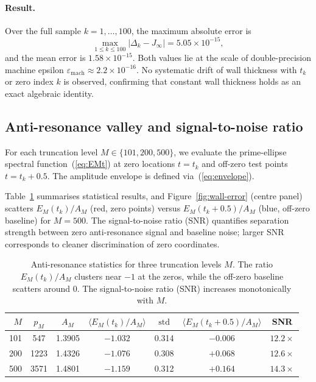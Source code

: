 \documentclass[10pt,reqno]{article}
\newcommand{\Jinf}{J_\infty}
\newcommand{\mach}{\varepsilon_{\text{mach}}}
\begin{document}
\paragraph{Result.} 
Over the full sample $k=1,\dots,100$, the maximum absolute error is
\[
\max_{1\le k\le 100} |\Delta_k - \Jinf| 
= 5.05\times10^{-15},
\]
and the mean error is $1.58\times10^{-15}$. Both values lie at the scale of double-precision machine epsilon $\mach\approx2.2\times10^{-16}$. No systematic drift of wall thickness with $t_k$ or zero index $k$ is observed, confirming that constant wall thickness holds as an exact algebraic identity.

\subsection{Anti-resonance valley and signal-to-noise ratio}
\label{subsec:anti-resonance-num}

For each truncation level $M\in\{101,200,500\}$, we evaluate the prime-ellipse spectral function~(\ref{eq:EMt}) at zero locations $t=t_k$ and off-zero test points $t=t_k+0.5$. The amplitude envelope is defined via~(\ref{eq:envelope}).

Table~\ref{tab:anti-resonance} summarises statistical results, and Figure~\ref{fig:wall-error} (centre panel) scatters $E_M(t_k)/A_M$ (red, zero points) versus $E_M(t_k+0.5)/A_M$ (blue, off-zero baseline) for $M=500$. The signal-to-noise ratio (SNR) quantifies separation strength between zero anti-resonance signal and baseline noise; larger SNR corresponds to cleaner discrimination of zero coordinates.

\begin{table}[htbp]
\centering
\caption{Anti-resonance statistics for three truncation levels $M$. The ratio $E_M(t_k)/A_M$ clusters near $-1$ at the zeros, while the off-zero baseline scatters around $0$. The signal-to-noise ratio (SNR) increases monotonically with $M$.}
\label{tab:anti-resonance}
\begin{tabular}{@{}rcccccc@{}}
\toprule
$M$ & $p_M$ & $A_M$ & 
$\langle E_M(t_k)/A_M\rangle$ & $\mathrm{std}$ & 
$\langle E_M(t_k+0.5)/A_M\rangle$ & SNR \\
\midrule
101 & 547  & 1.3905 & $-1.032$ & 0.314 & $-0.006$ & $12.2\times$ \\
200 & 1223 & 1.4326 & $-1.076$ & 0.308 & $+0.068$ & $12.6\times$ \\
500 & 3571 & 1.4801 & $-1.159$ & 0.312 & $+0.164$ & $14.3\times$ \\
\bottomrule
\end{tabular}
\end{table}
\end{document}
